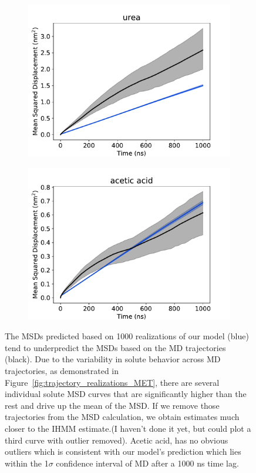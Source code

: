 \documentclass{article}
\begin{document}
\begin{figure}
\begin{subfigure}{0.45\textwidth}
  \includegraphics[width=\textwidth]{msd_URE.pdf}
  \caption{}\label{fig:msd_URE}
  \end{subfigure}
  \begin{subfigure}{0.45\textwidth}
  \includegraphics[width=\textwidth]{msd_ACH.pdf}
  \caption{}\label{fig:msd_ACH}
  \end{subfigure}
  \caption{The MSDs predicted based on 1000 realizations of our model (blue) tend to underpredict
  the MSDs based on the MD trajectories (black). Due to the variability in solute behavior across MD trajectories,
  as demonstrated in Figure~\ref{fig:trajectory_realizations_MET}, there are several 
  individual solute MSD curves that are significantly higher than the rest and drive up the
  mean of the MSD. If we remove those trajectories from the MSD calculation, we obtain 
  estimates much closer to the IHMM estimate.(I haven't done it yet, but could plot a third curve
  with outlier removed). Acetic acid, has no obvious outliers which is consistent with our model's
  prediction which lies within the 1$\sigma$ confidence interval of MD after a 1000 ns time lag.}\label{fig:msds}
  \end{figure}
  
\end{document}
